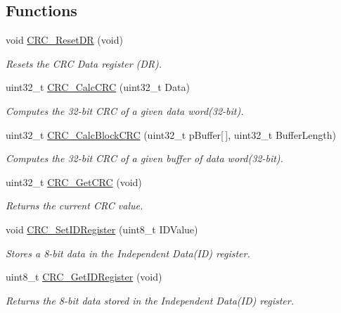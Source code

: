 \subsection*{Functions}
\begin{DoxyCompactItemize}
\item 
void \hyperlink{group___c_r_c_ga506467d5ef873a5a4ade4ae83cb110f6}{C\+R\+C\+\_\+\+Reset\+D\+R} (void)
\begin{DoxyCompactList}\small\item\em Resets the C\+R\+C Data register (D\+R). \end{DoxyCompactList}\item 
uint32\+\_\+t \hyperlink{group___c_r_c_ga5407fdbb8e8c9be6322cc8856ae5db3b}{C\+R\+C\+\_\+\+Calc\+C\+R\+C} (uint32\+\_\+t Data)
\begin{DoxyCompactList}\small\item\em Computes the 32-\/bit C\+R\+C of a given data word(32-\/bit). \end{DoxyCompactList}\item 
uint32\+\_\+t \hyperlink{group___c_r_c_gab15ebf620615c360048fb4f45b15fae6}{C\+R\+C\+\_\+\+Calc\+Block\+C\+R\+C} (uint32\+\_\+t p\+Buffer\mbox{[}$\,$\mbox{]}, uint32\+\_\+t Buffer\+Length)
\begin{DoxyCompactList}\small\item\em Computes the 32-\/bit C\+R\+C of a given buffer of data word(32-\/bit). \end{DoxyCompactList}\item 
uint32\+\_\+t \hyperlink{group___c_r_c_gab62db4561b0558f3c8ed53887fe7de8b}{C\+R\+C\+\_\+\+Get\+C\+R\+C} (void)
\begin{DoxyCompactList}\small\item\em Returns the current C\+R\+C value. \end{DoxyCompactList}\item 
void \hyperlink{group___c_r_c_ga769c9a42be57b972ae61bbada0f2e46a}{C\+R\+C\+\_\+\+Set\+I\+D\+Register} (uint8\+\_\+t I\+D\+Value)
\begin{DoxyCompactList}\small\item\em Stores a 8-\/bit data in the Independent Data(\+I\+D) register. \end{DoxyCompactList}\item 
uint8\+\_\+t \hyperlink{group___c_r_c_gaf869f6e9c3ca0ae0822cfad1abea7e5f}{C\+R\+C\+\_\+\+Get\+I\+D\+Register} (void)
\begin{DoxyCompactList}\small\item\em Returns the 8-\/bit data stored in the Independent Data(\+I\+D) register. \end{DoxyCompactList}\end{DoxyCompactItemize}


